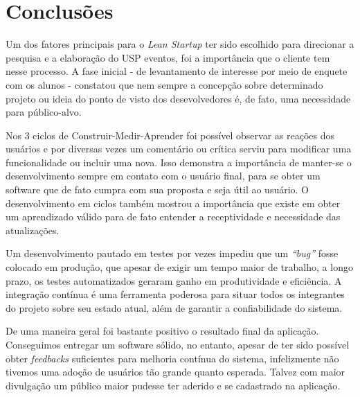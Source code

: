 \chapter{Conclusões}
\label{cap:conclusoes}

\par Um dos fatores principais para o \emph{Lean Startup} ter sido escolhido para direcionar a pesquisa e a elaboração do USP eventos, foi a importância que o cliente tem nesse processo. A fase inicial - de levantamento de interesse por meio de enquete com os alunos - constatou que nem sempre a concepção sobre determinado projeto ou ideia do ponto de visto dos desevolvedores é, de fato, uma necessidade para público-alvo.

\par Nos 3 ciclos de Construir-Medir-Aprender foi possível observar as reações dos usuários e por diversas vezes um comentário ou crítica serviu para modificar uma funcionalidade ou incluir uma nova. Isso demonstra a importância de manter-se o desenvolvimento sempre em contato com o usuário final, para se obter um software que de fato cumpra com sua proposta e seja útil ao usuário. O desenvolvimento em ciclos também mostrou a importância que existe em obter um aprendizado válido para de fato entender a receptividade e necessidade das atualizações.

\par Um desenvolvimento pautado em testes por vezes impediu que um \emph{``bug''} fosse colocado em produção, que apesar de exigir um tempo maior de trabalho, a longo prazo, os testes automatizados geraram ganho em produtividade e eficiência. A integração contínua é uma ferramenta poderosa para situar todos os integrantes do projeto sobre seu estado atual, além de garantir a confiabilidade do sistema.

\par De uma maneira geral foi bastante positivo o resultado final da aplicação. Conseguimos entregar um software sólido, no entanto, apesar de ter sido possível obter \emph{feedbacks} suficientes para melhoria contínua do sistema, infelizmente não tivemos uma adoção de usuários tão grande quanto esperada. Talvez com maior divulgação um público maior pudesse ter aderido e se cadastrado na aplicação.
